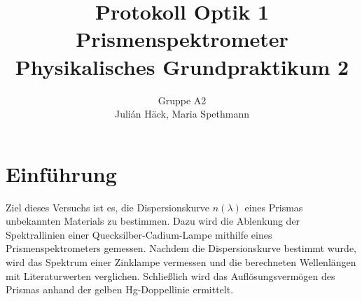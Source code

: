 \documentclass[12pt,a4paper]{article}
\author{Gruppe A2 \\ Julián Häck, Maria Spethmann}
\title{Protokoll Optik 1 \\ Prismenspektrometer \\ Physikalisches Grundpraktikum 2}
\begin{document}
	\maketitle
	\thispagestyle{empty} %
	\newpage
	\pagestyle{headings} %
	\tableofcontents
	\newpage

\section{Einführung}
Ziel dieses Versuchs ist es, die Dispersionskurve $n(\lambda)$ eines Prismas unbekannten Materials zu bestimmen. Dazu wird die Ablenkung der Spektrallinien einer Quecksilber-Cadium-Lampe mithilfe eines Prismenspektrometers gemessen. Nachdem die Dispersionskurve bestimmt wurde, wird das Spektrum einer Zinklampe vermessen und die berechneten Wellenlängen mit Literaturwerten verglichen. Schließlich wird das Auflösungsvermögen des Prismas anhand der gelben Hg-Doppellinie ermittelt.
\end{document}
